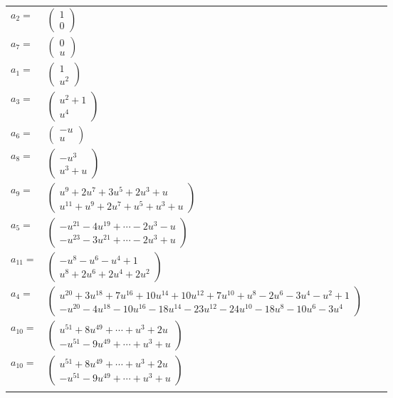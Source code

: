 \documentclass[1p]{elsarticle_modified}
\theoremstyle{definition}
\begin{document}
\begin{tabular}{m{7pt} m{180pt} m{7pt} m{180pt} }
\flushright $a_{2}=$&$\begin{pmatrix}1\\0\end{pmatrix}$ \\
\flushright $a_{7}=$&$\begin{pmatrix}0\\u\end{pmatrix}$ \\
\flushright $a_{1}=$&$\begin{pmatrix}1\\u^2\end{pmatrix}$ \\
\flushright $a_{3}=$&$\begin{pmatrix}u^2+1\\u^4\end{pmatrix}$ \\
\flushright $a_{6}=$&$\begin{pmatrix}- u\\u\end{pmatrix}$ \\
\flushright $a_{8}=$&$\begin{pmatrix}- u^3\\u^3+u\end{pmatrix}$ \\
\flushright $a_{9}=$&$\begin{pmatrix}u^9+2 u^7+3 u^5+2 u^3+u\\u^{11}+u^9+2 u^7+u^5+u^3+u\end{pmatrix}$ \\
\flushright $a_{5}=$&$\begin{pmatrix}- u^{21}-4 u^{19}+\cdots-2 u^3- u\\- u^{23}-3 u^{21}+\cdots-2 u^3+u\end{pmatrix}$ \\
\flushright $a_{11}=$&$\begin{pmatrix}- u^8- u^6- u^4+1\\u^8+2 u^6+2 u^4+2 u^2\end{pmatrix}$ \\
\flushright $a_{4}=$&$\begin{pmatrix}u^{20}+3 u^{18}+7 u^{16}+10 u^{14}+10 u^{12}+7 u^{10}+u^8-2 u^6-3 u^4- u^2+1\\- u^{20}-4 u^{18}-10 u^{16}-18 u^{14}-23 u^{12}-24 u^{10}-18 u^8-10 u^6-3 u^4\end{pmatrix}$ \\
\flushright $a_{10}=$&$\begin{pmatrix}u^{51}+8 u^{49}+\cdots+u^3+2 u\\- u^{51}-9 u^{49}+\cdots+u^3+u\end{pmatrix}$\\ \flushright $a_{10}=$&$\begin{pmatrix}u^{51}+8 u^{49}+\cdots+u^3+2 u\\- u^{51}-9 u^{49}+\cdots+u^3+u\end{pmatrix}$\\&\end{tabular}
\end{document}
